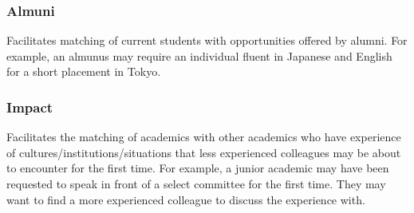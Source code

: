 \documentclass[11pt]{article}
\begin{document}
\subsubsection{Almuni}
Facilitates matching of current students with opportunities offered by alumni.  For example, an almunus may require an individual fluent in Japanese and English for a short placement in Tokyo.

\subsubsection{Impact}
Facilitates the matching of academics with other academics who have experience of cultures/institutions/situations that less experienced colleagues may be about to encounter for the first time.  For example, a junior academic may have been requested to speak in front of a select committee for the first time.  They may want to find a more experienced colleague to discuss the experience with.
\end{document}
